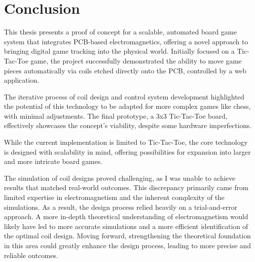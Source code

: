 \chapter*{Conclusion}


This thesis presents a proof of concept for a scalable, automated board game system that integrates PCB-based electromagnetics, offering a novel approach to bringing digital game tracking into the physical world. Initially focused on a Tic-Tac-Toe game, the project successfully demonstrated the ability to move game pieces automatically via coils etched directly onto the PCB, controlled by a web application.

The iterative process of coil design and control system development highlighted the potential of this technology to be adapted for more complex games like chess, with minimal adjustments. The final prototype, a 3x3 Tic-Tac-Toe board, effectively showcases the concept’s viability, despite some hardware imperfections.

While the current implementation is limited to Tic-Tac-Toe, the core technology is designed with scalability in mind, offering possibilities for expansion into larger and more intricate board games.

The simulation of coil designs proved challenging, as I was unable to achieve results that matched real-world outcomes. This discrepancy primarily came from limited expertise in electromagnetism and the inherent complexity of the simulations. As a result, the design process relied heavily on a trial-and-error approach. A more in-depth theoretical understanding of electromagnetism would likely have led to more accurate simulations and a more efficient identification of the optimal coil design. Moving forward, strengthening the theoretical foundation in this area could greatly enhance the design process, leading to more precise and reliable outcomes.